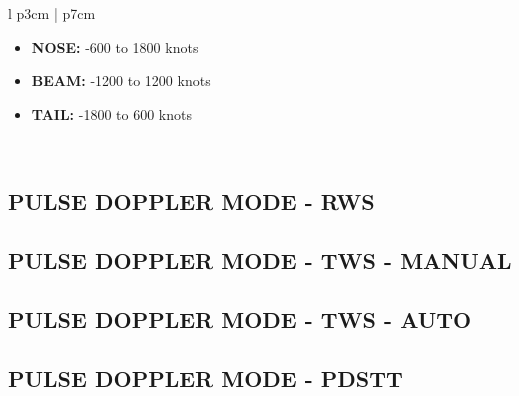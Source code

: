 \documentclass[8pt,usenames,dvipsnames,twoside]{article}
\begin{document}
\begin{center}
\begin{longtable}{l p{3cm} | p{7cm}}
				\begin{minipage}[t]{\linewidth}
					\vspace{-7pt}
					\begin{itemize}
						\item \textbf{NOSE:} -600 to 1800 knots
						\item \textbf{BEAM:} -1200 to 1200 knots
						\item \textbf{TAIL:} -1800 to 600 knots
					\end{itemize}
				\end{minipage} \\
				\bottomrule
			\end{longtable}
		\end{center}
		\begin{center}
		\end{center}
	
		
		\subsection{PULSE DOPPLER MODE - RWS}
		
		\subsection{PULSE DOPPLER MODE - TWS - MANUAL}
		
		\subsection{PULSE DOPPLER MODE - TWS - AUTO}
		
		\subsection{PULSE DOPPLER MODE - PDSTT}
		
		
		
		\cleardoublepage
		
\end{document}

